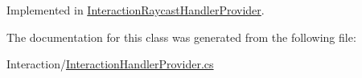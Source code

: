 Implemented in \mbox{\hyperlink{class_interaction_raycast_handler_provider_a28dd638d43f03de5601347fd39cb6211}{Interaction\+Raycast\+Handler\+Provider}}.



The documentation for this class was generated from the following file\+:\begin{DoxyCompactItemize}
\item 
Interaction/\mbox{\hyperlink{_interaction_handler_provider_8cs}{Interaction\+Handler\+Provider.\+cs}}\end{DoxyCompactItemize}
